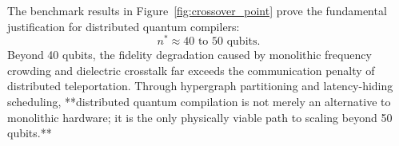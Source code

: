 The benchmark results in Figure~\ref{fig:crossover_point} prove the fundamental justification for distributed quantum compilers:
\begin{equation}
    n^* \approx 40\text{ to } 50\text{ qubits}.
\end{equation}
Beyond 40 qubits, the fidelity degradation caused by monolithic frequency crowding and dielectric crosstalk far exceeds the communication penalty of distributed teleportation. Through hypergraph partitioning and latency-hiding scheduling, **distributed quantum compilation is not merely an alternative to monolithic hardware; it is the only physically viable path to scaling beyond 50 qubits.**
